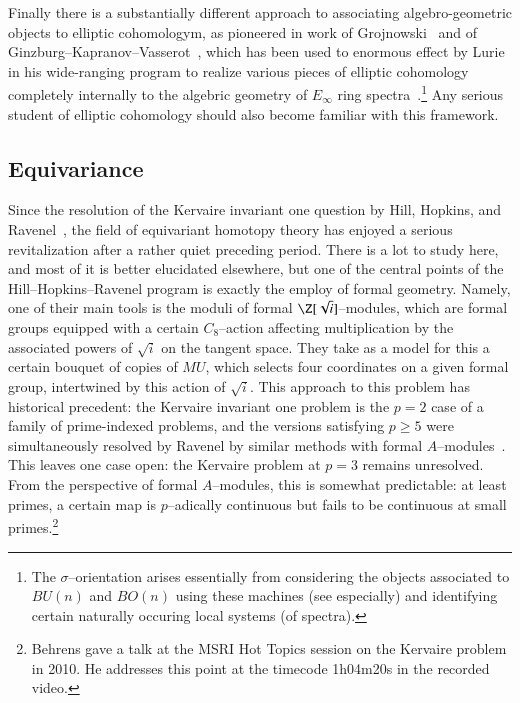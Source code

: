 Finally there is a substantially different approach to associating algebro-geometric objects to elliptic cohomologym, as pioneered in work of Grojnowski~\cite{Grojnowski} and of Ginzburg--Kapranov--Vasserot~\cite{GKV}, which has been used to enormous effect by Lurie in his wide-ranging program to realize various pieces of elliptic cohomology completely internally to the algebric geometry of $E_\infty$ ring spectra~\cite{LurieSurveyOfEll}.\footnote{The $\sigma$--orientation arises essentially from considering the objects associated to $BU(n)$ and $BO(n)$ using these machines (see \cite[Section 5.1]{LurieSurveyOfEll} especially) and identifying certain naturally occuring local systems (of spectra).}  Any serious student of elliptic cohomology should also become familiar with this framework.







\subsection*{Equivariance}

Since the resolution of the Kervaire invariant one question by Hill, Hopkins, and Ravenel~\cite{HHR}, the field of equivariant homotopy theory has enjoyed a serious revitalization after a rather quiet preceding period.  There is a lot to study here, and most of it is better elucidated elsewhere, but one of the central points of the Hill--Hopkins--Ravenel program is exactly the employ of formal geometry.  Namely, one of their main tools is the moduli of formal $\Z[\sqrt{i}]$--modules, which are formal groups equipped with a certain $C_8$--action affecting multiplication by the associated powers of $\sqrt{i}$ on the tangent space.  They take as a model for this a certain bouquet of copies of $MU$, which selects four coordinates on a given formal group, intertwined by this action of $\sqrt{i}$.  This approach to this problem has historical precedent: the Kervaire invariant one problem is the $p = 2$ case of a family of prime-indexed problems, and the versions satisfying $p \ge 5$ were simultaneously resolved by Ravenel by similar methods with formal $A$--modules~\cite{RavenelNonexistenceArfInvariantElts}.  This leaves one case open: the Kervaire problem at $p = 3$ remains unresolved.  From the perspective of formal $A$--modules, this is somewhat predictable: at least primes, a certain map is $p$--adically continuous but fails to be continuous at small primes.\footnote{Behrens gave a talk at the MSRI Hot Topics session on the Kervaire problem in 2010.  He addresses this point at the timecode 1h04m20s in the recorded video.}

